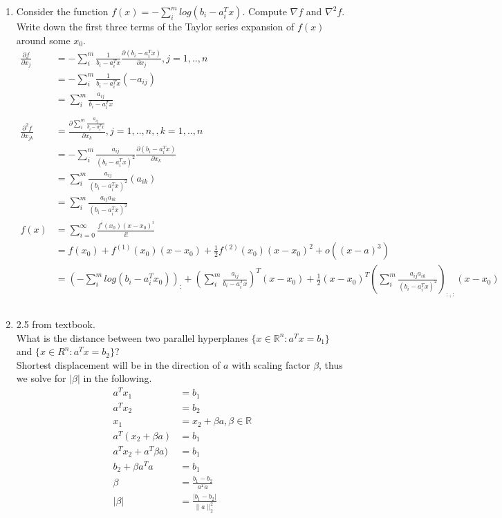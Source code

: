 \documentclass[12pt,letter]{article}
\newcommand{\R}{\mathbb{R}}
\newcommand{\ppartial}[2]{\frac{\partial #1}{\partial #2}}
\newcommand{\norm}[1]{\|#1\|}
\begin{document}

\begin{enumerate}
\item Consider the function $f(x)=-\sum_i^m log(b_i-a_i^Tx)$. Compute $\nabla f$ and $\nabla^2 f$. Write down the first three terms of the Taylor series expansion of $f(x)$ around some $x_0$.\\
  \begin{align*}
    \ppartial{f}{x_j} &= -\sum_i^m \frac{1}{b_i-a_i^T x} \ppartial{(b_i-a_i^Tx)}{x_j}, j=1,..,n\\
                      &= -\sum_i^m \frac{1}{b_i-a_i^T x} (-a_{ij})\\
                      &= \sum_i^m \frac{a_{ij}}{b_i-a_i^T x}\\
    \\
    \ppartial{^2 f}{x_{jk}} &= \ppartial{\sum_i^m \frac{a_{ij}}{b_i-a_i^T x}}{x_k}, j=1,..,n, , k=1,..,n\\
                      &= -\sum_i^m \frac{a_{ij}}{(b_i-a_i^T x)^2}\ppartial{(b_i-a_i^T x)}{x_k}\\
                      &= \sum_i^m \frac{a_{ij}}{(b_i-a_i^T x)^2}(a_{ik})\\
                      &= \sum_i^m \frac{a_{ij}a_{ik}}{(b_i-a_i^T x)^2}\\
    f(x) &= \sum_{i=0}^{\infty} \frac{f^i(x_0)(x-x_0)^i}{i!}\\
                      &=f(x_0)+f^{(1)}(x_0)(x-x_0)+\frac{1}{2}f^{(2)}(x_0)(x-x_0)^2+o((x-a)^3)\\
                      &=(-\sum_i^m log(b_i-a_i^Tx_0))_:+
    (\sum_i^m \frac{a_{ij}}{b_i-a_i^T x})^T (x-x_0)+
    \frac{1}{2} (x-x_0)^T (\sum_i^m \frac{a_{ij}a_{ik}}{(b_i-a_i^T x)^2})_{:,:} (x-x_0)\\
    \\
  \end{align*}
  
  \pagebreak
  
\item 2.5 from textbook.\\
  What is the distance between two parallel hyperplanes $\{x \in \R^n : a^Tx = b_1 \}$ and $\{x \in R^n : a^T x = b_2 \}$?\\
  Shortest displacement will be in the direction of $a$ with scaling factor $\beta$, thus we solve for $|\beta|$ in the following.
  \begin{align*}
    a^T x_1 &= b_1\\
    a^T x_2 &= b_2\\
    x_1 &= x_2 + \beta a, \beta \in \R\\
    a^T (x_2+\beta a) &= b_1\\
    a^T x_2+ a^T \beta a) &= b_1\\
    b_2 + \beta a^T a &= b_1\\
    \beta &= \frac{b_1-b_2}{a^T a}\\
    |\beta| &= \frac{|b_1-b_2|}{\norm{a}_2^2}\\
  \end{align*}
  

\end{enumerate}
\end{document}
